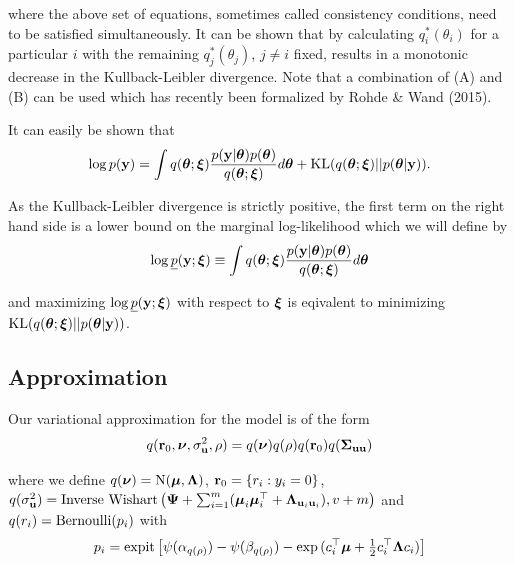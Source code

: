 \documentclass{amsart}[12pt]
\begin{document}
\noindent where the above set of equations, sometimes called consistency conditions, need to be 
satisfied simultaneously. It can be shown that by calculating $q_i^*(\theta_i)$ for a particular
$i$ with the remaining $q_j^*(\theta_j)$, $j\ne i$ fixed, results in a monotonic decrease in the 
Kullback-Leibler divergence. Note that a combination of (A) and (B) can be used which has recently
been formalized by Rohde \& Wand (2015). 

\noindent It can easily be shown that
$$
\displaystyle \log p({\bf y}) = \int q({\boldsymbol \theta};{\boldsymbol \xi})\frac{p({\bf y}|{\boldsymbol \theta})p({\boldsymbol \theta})}{q({\boldsymbol \theta};{\boldsymbol \xi})} d{\boldsymbol \theta} + \text{KL}(q({\boldsymbol \theta};{\boldsymbol \xi})||p({\boldsymbol \theta}|{\bf y})).
$$

\noindent As the Kullback-Leibler divergence is strictly positive, the first term on the right hand side
is a lower bound on the marginal log-likelihood which we will define by
$$
\displaystyle \log \underline{p}({\bf y};{\boldsymbol \xi}) \equiv \int q({\boldsymbol \theta};{\boldsymbol \xi})\frac{p({\bf y}|{\boldsymbol \theta})p({\boldsymbol \theta})}{q({\boldsymbol \theta};{\boldsymbol \xi})} d{\boldsymbol \theta}
$$

\noindent and maximizing $\log \underline{p}({\bf y};{\boldsymbol \xi})$ with respect to ${\boldsymbol \xi}$ is eqivalent to minimizing
$\text{KL}(q({\boldsymbol \theta};{\boldsymbol \xi})||p({\boldsymbol \theta}|{\bf y}))$.


\subsection{Approximation}

Our variational approximation for the model is of the form 
$$
q({\bf r}_0, {\boldsymbol \nu}, \sigma_{{\bf u}}^2, \rho) = q({\boldsymbol \nu})q(\rho) q({\bf r}_0)q({\boldsymbol \Sigma}_{{\bf u} {\bf u}})  \\
$$

\noindent 
where we define
$q({\boldsymbol \nu}) = \text{N}({\boldsymbol \mu}, {\boldsymbol \Lambda})$,
${\bf r}_0 = \{ r_i : y_i = 0 \}$,
$q(\sigma_{{\bf u}}^2) = \mbox{Inverse Wishart}\left({\boldsymbol \Psi} + \sum_{i=1}^m ({\boldsymbol \mu}_i {\boldsymbol \mu}_i^\top + {\boldsymbol \Lambda}_{{\bf u}_i {\bf u}_i}), v + m \right)$ \mbox{and } $q(r_i) = \text{Bernoulli} (p_i)$ with
$$
p_i = \text{expit} \left[ \psi{(\alpha_{q(\rho)})} - \psi{(\beta_{q(\rho)})} - \exp{(c_i^\top{\boldsymbol\mu}+  \tfrac{1}{2} c_i^\top {\boldsymbol\Lambda}c_i)} \right]
$$
\end{document}

